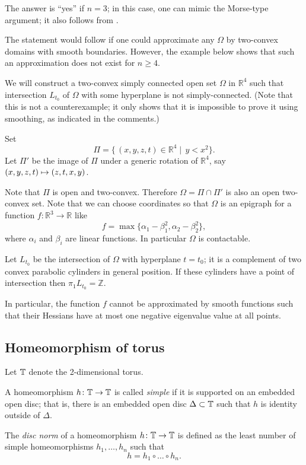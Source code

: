 The answer is ``yes'' if $n=3$; in this case, one can mimic the Morse-type argument;
it also follows from \cite[4.5.2 in][]{AKP-invitation}.

The statement would follow if one could approximate any $\Omega$ by two-convex domains with smooth boundaries.
However, the example below shows that such an approximation does not exist for $n\ge 4$.


We will construct a two-convex simply connected open set $\Omega$ in $\mathbb R^4$ such that intersection $L_{t_0}$ of $\Omega$ with some hyperplane is not simply-connected.
(Note that this is not a counterexample;
it only shows that it is impossible to prove it using smoothing, as indicated in the comments.)

Set 
$$\Pi=\{\,(x,y,z,t)\in\mathbb R^4\mid\,y< x^2\}.$$
Let $\Pi'$ be the image of $\Pi$ under a generic rotation of $\mathbb R^4$,
say $(x,y,z,t)\z\mapsto(z,t,x,y)$.

Note that $\Pi$ is open and two-convex.
Therefore $\Omega=\Pi\cap \Pi'$ is also an open two-convex set.
Note that we can choose coordinates so that $\Omega$ is an epigraph for a function $f\colon\mathbb R^3\to\mathbb R$ like
$$f=\max\{\alpha_1-\beta_1^2,\alpha_2-\beta_2^2 \},$$
where $\alpha_i$ and $\beta_i$ are linear functions.
In particular $\Omega$ is contactable.

Let $L_{t_0}$ be the intersection of $\Omega$ with hyperplane $t=t_0$;
it is a complement of two convex parabolic cylinders in general position. 
If these cylinders have a point of intersection then $\pi_1 L_{t_0}=\mathbb Z$.
 
In particular, the function $f$ cannot be approximated by smooth functions such that their Hessians have at most one negative eigenvalue value at all points.
 
\subsection*{Homeomorphism of torus}

Let $\mathbb{T}$ denote the 2-dimensional torus.

A homeomorphism $h\colon\mathbb{T}\to \mathbb{T}$ is called \emph{simple} if it is supported on an embedded open disc;
that is, there is an embedded open disc $\Delta\subset \mathbb{T}$ such that $h$ is identity outside of $\Delta$.

The \emph{disc norm} of a homeomorphism $h\colon\mathbb{T}\to \mathbb{T}$ is defined as the least number of simple homeomorphisms $h_1,\dots,h_n$ such that
\[h=h_1\circ\dots\circ h_n.\]

